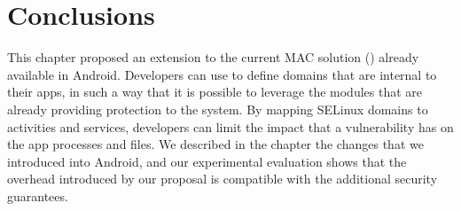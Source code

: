 \section{Conclusions}\label{sect:seapp_conclusions}

This chapter proposed an extension to the current MAC solution (\sel)
already available in Android.  Developers can use \sel to define
domains that are internal to their apps, in such a way that it is
possible to leverage the modules that are already providing protection
to the system.  By mapping SELinux domains to activities and services,
developers can limit the impact that a vulnerability has on the app
processes and files.  We described in the chapter the changes that we
introduced into Android, and our experimental evaluation shows that
the overhead introduced by our proposal is compatible with the
additional security guarantees.

